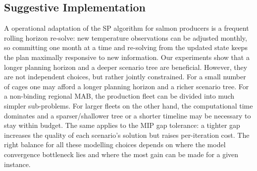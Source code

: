 \documentclass[12pt,a4paper]{article}
\begin{document}
\subsection{Suggestive Implementation}
\label{sec:impl-recommendation}
 
 
A operational adaptation of the SP algorithm for salmon producers is a frequent rolling horizon re-solve: new temperature observations can be adjusted monthly, so committing one month at a time and re-solving from the updated state keeps the plan maximally responsive to new information. Our experiments show that a longer planning horizon and a deeper scenario tree are beneficial. However, they are not independent choices, but rather jointly constrained. For a small number of cages one may afford a longer planning horizon and a richer scenario tree. For a non-binding regional MAB, the production fleet can be divided into much simpler sub-problems. For larger fleets on the  other hand, the computational time dominates and a sparser/shallower tree or a shorter timeline may be necessary to stay within budget. The same applies to the MIP gap tolerance: a tighter gap increases the quality of each scenario's solution but raises per-iteration cost. The right balance for all these modelling choices depends on where the model convergence bottleneck lies and where the most gain can be made for a given instance. 

 

\end{document}
